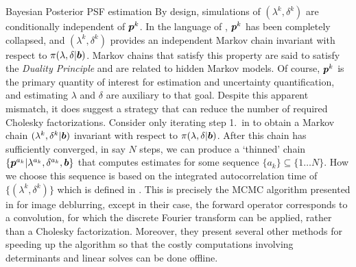 \begin{chapter}{Bayesian Posterior PSF estimation}
By design, simulations of $(\lambda^k,\delta^k)$ are conditionally independent of $\mbox{\boldmath$p$}^k$.
In the language of \citep{van2008partially}, $\mbox{\boldmath$p$}^k$ has been completely collapsed, and $(\lambda^k,\delta^k)$ provides an independent Markov chain invariant with respect to $\pi(\lambda,\delta|\mbox{\boldmath$b$})$.
Markov chains that satisfy this property are said to satisfy the \emph{Duality Principle} \citep[Section 9.2.3]{robert2013monte} and are related to hidden Markov models. %
Of course, $\mbox{\boldmath$p$}^k$ is the primary quantity of interest for estimation and uncertainty quantification, and estimating $\lambda$ and $\delta$ are auxiliary to that goal.
Despite this apparent mismatch, it does suggest a strategy that can reduce the number of required Cholesky factorizations.
Consider only iterating step 1.~in  to obtain a Markov chain $(\lambda^k,\delta^k|\mbox{\boldmath$b$})$ invariant with respect to $\pi(\lambda,\delta|\mbox{\boldmath$b$})$. 
After this chain has sufficiently converged, in say $N$ steps, we can produce a `thinned' chain $\{\mbox{\boldmath$p$}^{a_k}|\lambda^{a_k},\delta^{a_k},\mbox{\boldmath$b$}\}$ that computes estimates for some sequence $\{a_k\} \subseteq \{1\dots N\}$.
How we choose this sequence is based on the integrated autocorrelation time of $\{(\lambda^k,\delta^k)\}$ which is defined in .
This is precisely the MCMC algorithm presented in \citep{fox2015fast} for image deblurring, except in their case, the forward operator corresponds to a convolution, for which the discrete Fourier transform can be applied, rather than a Cholesky factorization.
Moreover, they present several other methods for speeding up the algorithm so that the costly computations involving determinants and linear solves can be done offline.


\end{chapter}
